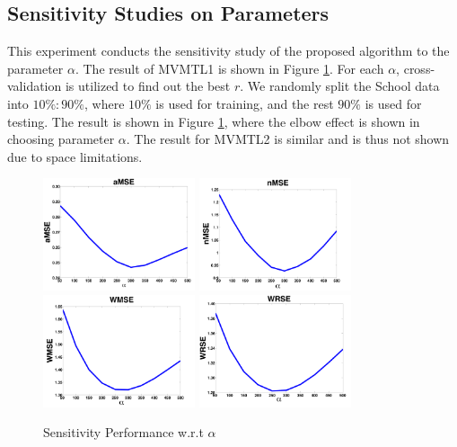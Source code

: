 \documentclass[twoside,leqno,twocolumn]{article}
\begin{document}
\subsection{Sensitivity Studies on Parameters }
%
This experiment conducts the sensitivity study of the proposed
algorithm to the parameter $\alpha$. The result of MVMTL1 is shown in Figure \ref{fig:sensitivity}.
For each $\alpha$, cross-validation is utilized to find out the best $r$. We randomly split the School data into $10\% :90\% $, where $10\%$ is used for training, and the rest $90\%$ is used for testing. The result is shown in Figure \ref{fig:sensitivity}, where the elbow effect is shown in choosing parameter $\alpha$. The result for MVMTL2 is similar and is thus not shown due to space limitations.
%

\begin{figure}[hp]
\centering
\begin{minipage}{1\textwidth}
\includegraphics[width= .24\textwidth, height=1.3in]{figures/AMSE.pdf}
\includegraphics[width= .24\textwidth, height=1.3in]{figures/NMSE.pdf}
\includegraphics[width= .24\textwidth, height=1.3in]{figures/WMSE.pdf}
\includegraphics[width= .24\textwidth, height=1.3in]{figures/WRSE.pdf}
\caption{Sensitivity Performance w.r.t $\alpha$}
\label{fig:sensitivity}
\end{minipage}
\end{figure}
\end{document}
